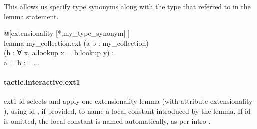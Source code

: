 \documentclass{article}
\begin{document}
This allows us specify type synonyms along with the type
that referred to in the lemma statement.
\\
\colorbox[RGB]{253,246,227}{\parbox{4.5in}{{{{\color[RGB]{88, 110, 117} @{[}extensionality {[}*,my\_type\_synonym{]} }}}{{{\color[RGB]{101, 123, 131} {]}
 }}}\\
{{{\color[RGB]{133, 153, 0} lemma }}}{{{\color[RGB]{101, 123, 131}   }}}{{{\color[RGB]{211, 54, 130} my\_collection.ext }}}{{{\color[RGB]{101, 123, 131}   }}}{{{\color[RGB]{101, 123, 131} (a b : my\_collection)
 }}}\\
{{{\color[RGB]{101, 123, 131}   (h :  }}}{{{\color[RGB]{133, 153, 0} ∀ }}}{{{\color[RGB]{101, 123, 131}  x, a.lookup x  }}}{{{\color[RGB]{181, 137, 0} = }}}{{{\color[RGB]{101, 123, 131}  b.lookup y) :
 }}}\\
{{{\color[RGB]{101, 123, 131}   a  }}}{{{\color[RGB]{181, 137, 0} = }}}{{{\color[RGB]{101, 123, 131}  b  }}}{{{\color[RGB]{181, 137, 0} := }}}{{{\color[RGB]{101, 123, 131}  ...
 }}}\\

}}\paragraph{tactic.interactive.ext1}
\par
\colorbox[RGB]{253,246,227}{{{{\color[RGB]{101, 123, 131} ext1 id }}}} selects and apply one extensionality lemma (with attribute
\colorbox[RGB]{253,246,227}{{{{\color[RGB]{101, 123, 131} extensionality }}}}), using 
\colorbox[RGB]{253,246,227}{{{{\color[RGB]{101, 123, 131} id }}}}, if provided, to name a local constant
introduced by the lemma. If 
\colorbox[RGB]{253,246,227}{{{{\color[RGB]{101, 123, 131} id }}}} is omitted, the local constant is
named automatically, as per 
\colorbox[RGB]{253,246,227}{{{{\color[RGB]{101, 123, 131} intro }}}}.
\end{document}
